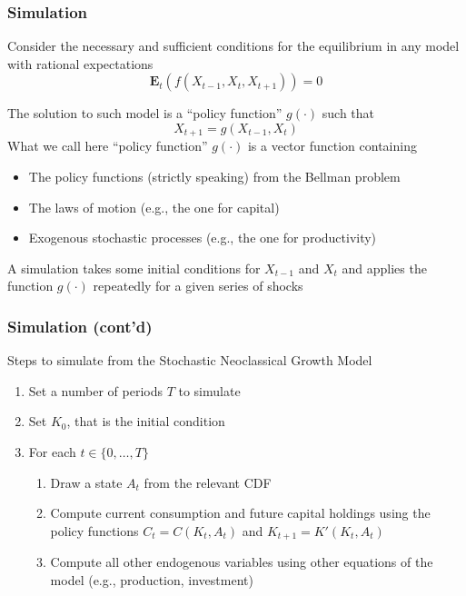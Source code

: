 \documentclass[10pt, aspectratio=1610, handout]{beamer}
\newcommand{\E}{\mathbf{E}}
\begin{document}
  \begin{frame}
    \frametitle{Simulation}

    Consider the necessary and sufficient conditions for the equilibrium in any model with rational expectations
    \begin{equation*}
      \E_t \left( f \left( X_{t-1}, X_t, X_{t+1} \right) \right) = 0
    \end{equation*}

    \vfill\pause

    The solution to such model is a ``policy function'' $g(\cdot)$ such that
    \begin{equation*}
      X_{t+1} = g(X_{t-1}, X_t)
    \end{equation*}
    What we call here ``policy function'' $g(\cdot)$ is a vector function containing
    \begin{itemize}
      \item The policy functions (strictly speaking) from the Bellman problem
      \item The laws of motion (e.g., the one for capital)
      \item Exogenous stochastic processes (e.g., the one for productivity)
    \end{itemize}

    \vfill\pause

    A simulation takes some initial conditions for $X_{t-1}$ and $X_t$ and applies the function $g(\cdot)$ repeatedly for a given series of shocks

  \end{frame}

  \begin{frame}
    \frametitle{Simulation (cont'd)}

    Steps to simulate from the Stochastic Neoclassical Growth Model

    \vfill\pause

    \begin{enumerate}
      \item Set a number of periods $T$ to simulate
      \vfill\pause
      \item Set $K_0$, that is the initial condition
      \vfill\pause
      \item For each $t \in \{0, \ldots, T\}$
      \vfill\pause
        \begin{enumerate}
          \item Draw a state $A_t$ from the relevant CDF
          \vfill\pause
          \item Compute current consumption and future capital holdings using the policy functions $C_t = C(K_t, A_t)$ and $K_{t+1} = K'(K_t, A_t)$
          \vfill\pause
          \item Compute all other endogenous variables using other equations of the model (e.g., production, investment)
        \end{enumerate}
    \end{enumerate}

  \end{frame}
\end{document}
